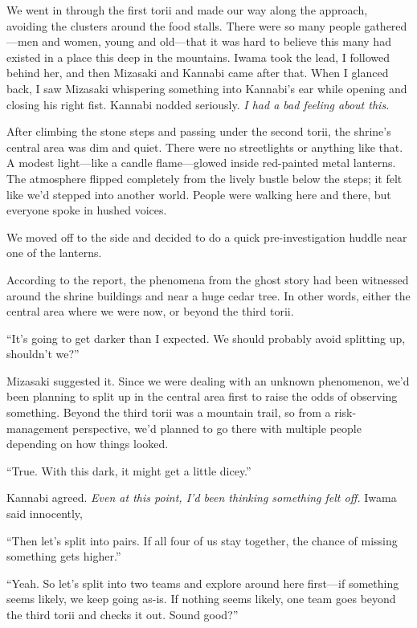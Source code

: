 \documentclass[
    a4paper,
    12pt,
    twoside,
    openany,
    UTF8,
    fontset=windows
]{ctexbook}
\begin{document}
We went in through the first torii and made our way along the approach, avoiding the clusters around the food stalls. There were so many people gathered---men and women, young and old---that it was hard to believe this many had existed in a place this deep in the mountains. Iwama took the lead, I followed behind her, and then Mizasaki and Kannabi came after that. When I glanced back, I saw Mizasaki whispering something into Kannabi's ear while opening and closing his right fist. Kannabi nodded seriously. \textit{I had a bad feeling about this.}

After climbing the stone steps and passing under the second torii, the shrine's central area was dim and quiet. There were no streetlights or anything like that. A modest light---like a candle flame---glowed inside red-painted metal lanterns. The atmosphere flipped completely from the lively bustle below the steps; it felt like we'd stepped into another world. People were walking here and there, but everyone spoke in hushed voices.

We moved off to the side and decided to do a quick pre-investigation huddle near one of the lanterns.

According to the report, the phenomena from the ghost story had been witnessed around the shrine buildings and near a huge cedar tree. In other words, either the central area where we were now, or beyond the third torii.

``It's going to get darker than I expected. We should probably avoid splitting up, shouldn't we?''

Mizasaki suggested it. Since we were dealing with an unknown phenomenon, we'd been planning to split up in the central area first to raise the odds of observing something. Beyond the third torii was a mountain trail, so from a risk-management perspective, we'd planned to go there with multiple people depending on how things looked.

``True. With this dark, it might get a little dicey.''

Kannabi agreed. \textit{Even at this point, I'd been thinking something felt off.} Iwama said innocently,

``Then let's split into pairs. If all four of us stay together, the chance of missing something gets higher.''

``Yeah. So let's split into two teams and explore around here first---if something seems likely, we keep going as-is. If nothing seems likely, one team goes beyond the third torii and checks it out. Sound good?''
\end{document}
